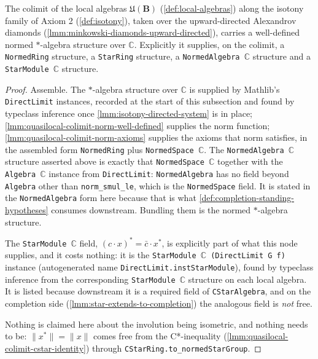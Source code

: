 \begin{lemma}
    \label{lmm:quasilocal-union-normed-star-algebra}
    \leanok
    The colimit of the local algebras $\mathfrak{U}(\mathbf{B})$ (\ref{def:local-algebras}) along the isotony family of Axiom 2 (\ref{def:isotony}), taken over the upward-directed Alexandrov diamonds (\ref{lmm:minkowski-diamonds-upward-directed}), carries a well-defined normed $*$-algebra structure over $\mathbb{C}$. Explicitly it supplies, on the colimit, a \texttt{NormedRing} structure, a \texttt{StarRing} structure, a \texttt{NormedAlgebra \ensuremath{\mathbb{C}}} structure and a \texttt{StarModule \ensuremath{\mathbb{C}}} structure.
\end{lemma}
\begin{proof}
    \leanok
    Assemble. The $*$-algebra structure over $\mathbb{C}$ is supplied by Mathlib's \texttt{DirectLimit} instances, recorded at the start of this subsection and found by typeclass inference once \ref{lmm:isotony-directed-system} is in place; \ref{lmm:quasilocal-colimit-norm-well-defined} supplies the norm function; \ref{lmm:quasilocal-colimit-norm-axioms} supplies the axioms that norm satisfies, in the assembled form \texttt{NormedRing} plus \texttt{NormedSpace \ensuremath{\mathbb{C}}}. The \texttt{NormedAlgebra \ensuremath{\mathbb{C}}} structure asserted above is exactly that \texttt{NormedSpace \ensuremath{\mathbb{C}}} together with the \texttt{Algebra \ensuremath{\mathbb{C}}} instance from \texttt{DirectLimit}: \texttt{NormedAlgebra} has no field beyond \texttt{Algebra} other than \texttt{norm\_smul\_le}, which is the \texttt{NormedSpace} field. It is stated in the \texttt{NormedAlgebra} form here because that is what \ref{def:completion-standing-hypotheses} consumes downstream. Bundling them is the normed $*$-algebra structure.

    The \texttt{StarModule \ensuremath{\mathbb{C}}} field, $(c \cdot x)^{*} = \bar{c} \cdot x^{*}$, is explicitly part of what this node supplies, and it costs nothing: it is the \texttt{StarModule \ensuremath{\mathbb{C}} (DirectLimit G f)} instance (autogenerated name \texttt{DirectLimit.instStarModule}), found by typeclass inference from the corresponding \texttt{StarModule \ensuremath{\mathbb{C}}} structure on each local algebra. It is listed because downstream it is a required field of \texttt{CStarAlgebra}, and on the completion side (\ref{lmm:star-extends-to-completion}) the analogous field is \emph{not} free.

    Nothing is claimed here about the involution being isometric, and nothing needs to be: $\|x^{*}\| = \|x\|$ comes free from the C*-inequality (\ref{lmm:quasilocal-colimit-cstar-identity}) through \texttt{CStarRing.to\_normedStarGroup}.
\end{proof}

